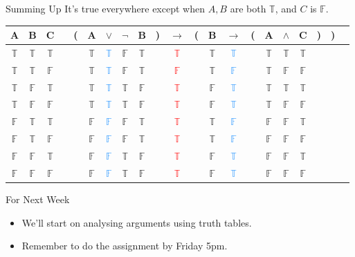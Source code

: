 \documentclass[
  ignorenonframetext,
]{beamer}
\providecommand{\tightlist}{%
  \setlength{\itemsep}{0pt}\setlength{\parskip}{0pt}}
\renewcommand{\,}{\text{, }}
\def\True{\mathbb{T}}
\def\False{\mathbb{F}}
\begin{document}
\begin{frame}{Summing Up}
\protect\hypertarget{summing-up}{}
It's true everywhere except when \(A, B\) are both \(\True\), and \(C\)
is \(\False\).

\begin{center}

\begin{tabular}{@{ }c@{ }@{ }c@{ }@{ }c | c@{ }@{}c@{}@{ }c@{ }@{ }c@{ }@{ }c@{ }@{ }c@{ }@{}c@{}@{ }c@{ }@{}c@{}@{ }c@{ }@{ }c@{ }@{}c@{}@{ }c@{ }@{ }c@{ }@{ }c@{ }@{}c@{}@{}c@{}@{ }c}
A & B & C &  & ( & A & $\vee$ & $\neg$ & B & ) & $\rightarrow$ & ( & B & $\rightarrow$ & ( & A & $\wedge$ & C & ) & ) & \\
\hline 
 $\True$ & $\True$ & $\True$ &  &  & $\True$ & \textcolor{dodgerblue}{$\True$} & $\False$ & $\True$ &  &\textcolor{red}{$\True$}&  & $\True$ & \textcolor{dodgerblue}{$\True$} &  & $\True$ & $\True$ & $\True$ &  &  & \\
 $\True$ & $\True$ & $\False$ &  &  & $\True$ & \textcolor{dodgerblue}{$\True$} & $\False$ & $\True$ &  &\textcolor{red}{$\False$}&  & $\True$ & \textcolor{dodgerblue}{$\False$} &  & $\True$ & $\False$ & $\False$ &  &  & \\
 $\True$ & $\False$ & $\True$ &  &  & $\True$ & \textcolor{dodgerblue}{$\True$} & $\True$ & $\False$ &  &\textcolor{red}{$\True$}&  & $\False$ & \textcolor{dodgerblue}{$\True$} &  & $\True$ & $\True$ & $\True$ &  &  & \\
 $\True$ & $\False$ & $\False$ &  &  & $\True$ & \textcolor{dodgerblue}{$\True$} & $\True$ & $\False$ &  &\textcolor{red}{$\True$}&  & $\False$ & \textcolor{dodgerblue}{$\True$} &  & $\True$ & $\False$ & $\False$ &  &  & \\
 $\False$ & $\True$ & $\True$ &  &  & $\False$ & \textcolor{dodgerblue}{$\False$} & $\False$ & $\True$ &  &\textcolor{red}{$\True$}&  & $\True$ & \textcolor{dodgerblue}{$\False$} &  & $\False$ & $\False$ & $\True$ &  &  & \\
 $\False$ & $\True$ & $\False$ &  &  & $\False$ & \textcolor{dodgerblue}{$\False$} & $\False$ & $\True$ &  &\textcolor{red}{$\True$}&  & $\True$ & \textcolor{dodgerblue}{$\False$} &  & $\False$ & $\False$ & $\False$ &  &  & \\
 $\False$ & $\False$ & $\True$ &  &  & $\False$ & \textcolor{dodgerblue}{$\False$} & $\True$ & $\False$ &  &\textcolor{red}{$\True$}&  & $\False$ & \textcolor{dodgerblue}{$\True$} &  & $\False$ & $\False$ & $\True$ &  &  & \\
 $\False$ & $\False$ & $\False$ &  &  & $\False$ & \textcolor{dodgerblue}{$\False$} & $\True$ & $\False$ &  &\textcolor{red}{$\True$}&  & $\False$ & \textcolor{dodgerblue}{$\True$} &  & $\False$ & $\False$ & $\False$ &  &  & \\
\end{tabular}

\end{center}
\end{frame}

\begin{frame}{For Next Week}
\protect\hypertarget{for-next-week}{}
\begin{itemize}
\tightlist
\item
  We'll start on analysing arguments using truth tables.
\item
  Remember to do the assignment by Friday 5pm.
\end{itemize}
\end{frame}
\end{document}
